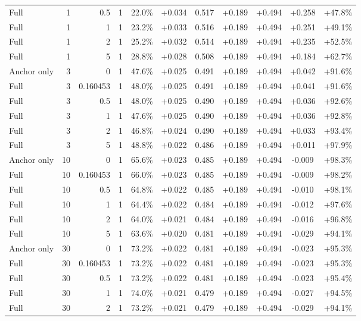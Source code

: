 \begin{table}[htbp]
\begin{tabular}{lrrrccccccc}
Full & 1 & 0.5 & 1 & 22.0\% & +0.034 & 0.517 & +0.189 & +0.494 & +0.258 & +47.8\% \\
Full & 1 & 1 & 1 & 23.2\% & +0.033 & 0.516 & +0.189 & +0.494 & +0.251 & +49.1\% \\
Full & 1 & 2 & 1 & 25.2\% & +0.032 & 0.514 & +0.189 & +0.494 & +0.235 & +52.5\% \\
Full & 1 & 5 & 1 & 28.8\% & +0.028 & 0.508 & +0.189 & +0.494 & +0.184 & +62.7\% \\
Anchor only & 3 & 0 & 1 & 47.6\% & +0.025 & 0.491 & +0.189 & +0.494 & +0.042 & +91.6\% \\
Full & 3 & 0.160453 & 1 & 48.0\% & +0.025 & 0.491 & +0.189 & +0.494 & +0.041 & +91.6\% \\
Full & 3 & 0.5 & 1 & 48.0\% & +0.025 & 0.490 & +0.189 & +0.494 & +0.036 & +92.6\% \\
Full & 3 & 1 & 1 & 47.6\% & +0.025 & 0.490 & +0.189 & +0.494 & +0.036 & +92.8\% \\
Full & 3 & 2 & 1 & 46.8\% & +0.024 & 0.490 & +0.189 & +0.494 & +0.033 & +93.4\% \\
Full & 3 & 5 & 1 & 48.8\% & +0.022 & 0.486 & +0.189 & +0.494 & +0.011 & +97.9\% \\
Anchor only & 10 & 0 & 1 & 65.6\% & +0.023 & 0.485 & +0.189 & +0.494 & -0.009 & +98.3\% \\
Full & 10 & 0.160453 & 1 & 66.0\% & +0.023 & 0.485 & +0.189 & +0.494 & -0.009 & +98.2\% \\
Full & 10 & 0.5 & 1 & 64.8\% & +0.022 & 0.485 & +0.189 & +0.494 & -0.010 & +98.1\% \\
Full & 10 & 1 & 1 & 64.4\% & +0.022 & 0.484 & +0.189 & +0.494 & -0.012 & +97.6\% \\
Full & 10 & 2 & 1 & 64.0\% & +0.021 & 0.484 & +0.189 & +0.494 & -0.016 & +96.8\% \\
Full & 10 & 5 & 1 & 63.6\% & +0.020 & 0.481 & +0.189 & +0.494 & -0.029 & +94.1\% \\
Anchor only & 30 & 0 & 1 & 73.2\% & +0.022 & 0.481 & +0.189 & +0.494 & -0.023 & +95.3\% \\
Full & 30 & 0.160453 & 1 & 73.2\% & +0.022 & 0.481 & +0.189 & +0.494 & -0.023 & +95.3\% \\
Full & 30 & 0.5 & 1 & 73.2\% & +0.022 & 0.481 & +0.189 & +0.494 & -0.023 & +95.4\% \\
Full & 30 & 1 & 1 & 74.0\% & +0.021 & 0.479 & +0.189 & +0.494 & -0.027 & +94.5\% \\
Full & 30 & 2 & 1 & 73.2\% & +0.021 & 0.479 & +0.189 & +0.494 & -0.029 & +94.1\% \\

\end{tabular}
\end{table}
